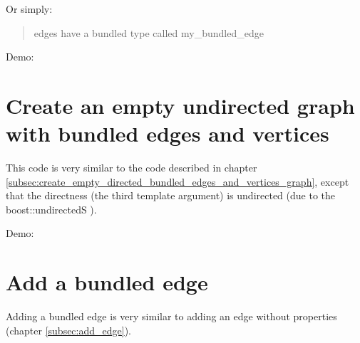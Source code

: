 Or simply: 

\begin{quote}
edges have a bundled type called my\_bundled\_edge
\end{quote}

Demo:



\section{Create an empty undirected graph with bundled edges and vertices}
\label{subsec:create_empty_undirected_bundled_edges_and_vertices_graph}



This code is very similar to the code described in chapter 
\ref{subsec:create_empty_directed_bundled_edges_and_vertices_graph}, 
except that the directness (the third template argument) is undirected
 (due to the boost::undirectedS ).

Demo:



\section{Add a bundled edge}
\label{subsec:add_bundled_edge}

Adding a bundled edge is very similar to adding an edge 
without properties (chapter \ref{subsec:add_edge}).

